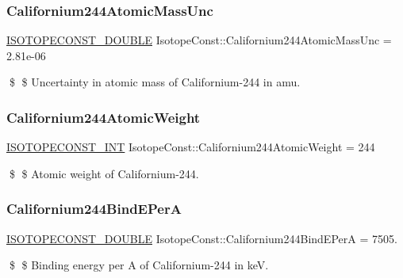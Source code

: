 \subsubsection{\texorpdfstring{Californium244\+Atomic\+Mass\+Unc}{Californium244AtomicMassUnc}}
{\footnotesize\ttfamily \mbox{\hyperlink{group___isotope_const-_macros_ga8f45a7272ce02c0b4c65c44636ed719a}{I\+S\+O\+T\+O\+P\+E\+C\+O\+N\+S\+T\+\_\+\+D\+O\+U\+B\+LE}} Isotope\+Const\+::\+Californium244\+Atomic\+Mass\+Unc = 2.\+81e-\/06}

\$ \$ Uncertainty in atomic mass of Californium-\/244 in amu. \mbox{\label{group___isotope_const-_californium-_cf244_gab25382b1d9237f058d010fc0b172b3a9}} 
\subsubsection{\texorpdfstring{Californium244\+Atomic\+Weight}{Californium244AtomicWeight}}
{\footnotesize\ttfamily \mbox{\hyperlink{group___isotope_const-_macros_ga5f18360b3e99483a35c32d789e62621c}{I\+S\+O\+T\+O\+P\+E\+C\+O\+N\+S\+T\+\_\+\+I\+NT}} Isotope\+Const\+::\+Californium244\+Atomic\+Weight = 244}

\$ \$ Atomic weight of Californium-\/244. \mbox{\label{group___isotope_const-_californium-_cf244_ga66211d52df100f27a3b30c3f9ab6e3cc}} 
\subsubsection{\texorpdfstring{Californium244\+Bind\+E\+PerA}{Californium244BindEPerA}}
{\footnotesize\ttfamily \mbox{\hyperlink{group___isotope_const-_macros_ga8f45a7272ce02c0b4c65c44636ed719a}{I\+S\+O\+T\+O\+P\+E\+C\+O\+N\+S\+T\+\_\+\+D\+O\+U\+B\+LE}} Isotope\+Const\+::\+Californium244\+Bind\+E\+PerA = 7505.}

\$ \$ Binding energy per A of Californium-\/244 in keV. \mbox{\label{group___isotope_const-_californium-_cf244_ga1e5d378193794f4a0b8ccb1d8cf07433}} 
